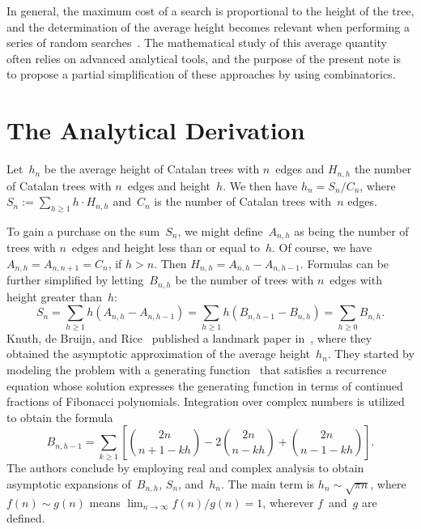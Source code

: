 \documentclass[11pt]{article}
\begin{document}
In general, the maximum cost of a search is proportional to the height
of the tree, and the determination of the average height becomes
relevant when performing a series of random
searches~\cite{VitterFlajolet:1990}. The mathematical study of this
average quantity often relies on advanced analytical tools, and the
purpose of the present note is to propose a partial simplification of
these approaches by using combinatorics.

\section*{The Analytical Derivation}

Let~\(h_n\) be the average height of Catalan trees with \(n\)~edges
and \(H_{n,h}\) the number of Catalan trees with \(n\)~edges and
height~\(h\). We then have \(h_n = S_n/C_{n}\), where \(S_n := \sum_{h
  \geqslant 1} h \cdot H_{n,h}\) and~\(C_n\) is the number of Catalan
trees with~\(n\) edges.

To gain a purchase on the sum~\(S_n\), we might define~\(A_{n,h}\) as
being the number of trees with \(n\)~edges and height less than or
equal to~\(h\). Of course, we have \(A_{n,h} = A_{n,n+1} = C_{n}\), if
\(h > n\). Then \(H_{n,h} = A_{n,h}-A_{n,h-1}\). Formulas can be
further simplified by letting~\(B_{n,h}\) be the number of trees with
\(n\)~edges with height greater than~\(h\):
\begin{equation}
S_n = \sum_{h \geqslant 1}h(A_{n,h}-A_{n,h-1})
    = \sum_{h \geqslant 1}h(B_{n,h-1}-B_{n,h}) = \sum_{h\geqslant 0} B_{n,h}.
\label{eq:Sn}
\end{equation} 
Knuth, de Bruijn, and Rice~\cite{KnuthdeBruijnRice:1972} published a
landmark paper in~, where they obtained the
asymptotic approximation of the average height~\(h_n\). They started
by modeling the problem with a generating function~\cite{Wilf:1990}
that satisfies a recurrence equation whose solution expresses the
generating function in terms of continued fractions of Fibonacci
polynomials. Integration over complex numbers is utilized to obtain
the formula
\begin{equation}
B_{n,h-1} = \sum_{k \geqslant 1}\left[\binom{2n}{n+1-kh}
           - 2\binom{2n}{n-kh} + \binom{2n}{n-1-kh}\right].
\label{eq:Bn}
\end{equation}
The authors conclude by employing real and complex analysis to obtain
asymptotic expansions of~\(B_{n,h}\), \(S_n\), and~\(h_n\). The main
term is \(h_n \sim \sqrt{\pi n}\), where \(f(n) \sim g(n)\) means
\(\lim_{n \rightarrow \infty} f(n)/g(n) = 1\), wherever
\(f\)~and~\(g\) are defined.
  
\end{document}
